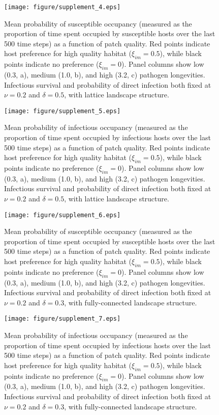 \documentclass{article}
\begin{document}
\begin{figure}
\texttt{[image: figure/supplement\_4.eps]}
\centering
\caption{Mean probability of susceptible occupancy (measured as the proportion of time spent occupied by susceptible hosts over the last 500 time steps) as a function of patch quality. Red points indicate host preference for high quality habitat ($\xi_{im} = 0.5$), while black points indicate no preference ($\xi_{im} = 0$). Panel columns show low (0.3, a), medium (1.0, b), and high (3.2, c) pathogen longevities.  Infectious survival and probability of direct infection both fixed at $\nu = 0.2$ and $\delta = 0.5$, with lattice landscape structure.}
\end{figure}

\begin{figure}
\texttt{[image: figure/supplement\_5.eps]}
\centering
\caption{Mean probability of infectious occupancy (measured as the proportion of time spent occupied by infectious hosts over the last 500 time steps) as a function of patch quality. Red points indicate host preference for high quality habitat ($\xi_{im} = 0.5$), while black points indicate no preference ($\xi_{im} = 0$). Panel columns show low (0.3, a), medium (1.0, b), and high (3.2, c) pathogen longevities.  Infectious survival and probability of direct infection both fixed at $\nu = 0.2$ and $\delta = 0.5$, with lattice landscape structure.}
\end{figure}

\begin{figure}
\texttt{[image: figure/supplement\_6.eps]}
\centering
\caption{Mean probability of susceptible occupancy (measured as the proportion of time spent occupied by susceptible hosts over the last 500 time steps) as a function of patch quality. Red points indicate host preference for high quality habitat ($\xi_{im} = 0.5$), while black points indicate no preference ($\xi_{im} = 0$). Panel columns show low (0.3, a), medium (1.0, b), and high (3.2, c) pathogen longevities.  Infectious survival and probability of direct infection both fixed at $\nu = 0.2$ and $\delta = 0.3$, with fully-connected landscape structure.}
\end{figure}

\begin{figure}
\texttt{[image: figure/supplement\_7.eps]}
\centering
\caption{Mean probability of infectious occupancy (measured as the proportion of time spent occupied by infectious hosts over the last 500 time steps) as a function of patch quality. Red points indicate host preference for high quality habitat ($\xi_{im} = 0.5$), while black points indicate no preference ($\xi_{im} = 0$). Panel columns show low (0.3, a), medium (1.0, b), and high (3.2, c) pathogen longevities.  Infectious survival and probability of direct infection both fixed at $\nu = 0.2$ and $\delta = 0.3$, with fully-connected landscape structure.}
\end{figure}
\end{document}
